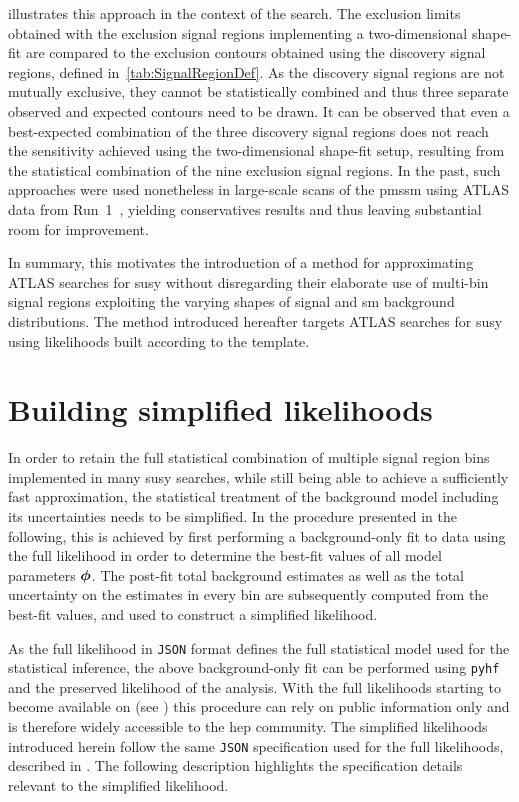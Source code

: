  illustrates this approach in the context of the \onelepton search. The exclusion limits obtained with the exclusion signal regions implementing a two-dimensional shape-fit are compared to the exclusion contours obtained using the discovery signal regions, defined in~\cref{tab:SignalRegionDef}.
As the discovery signal regions are not mutually exclusive, they cannot be statistically combined and thus three separate observed and expected contours need to be drawn. It can be observed that even a best-expected combination of the three discovery signal regions does not reach the sensitivity achieved using the two-dimensional shape-fit setup, resulting from the statistical combination of the nine exclusion signal regions.
In the past, such approaches were used nonetheless in large-scale scans of the \gls{pmssm} using ATLAS data from Run~1~\cite{pMSSM-scan-run1:2015baa,Aaboud:2016wna}, yielding conservatives results and thus leaving substantial room for improvement.

In summary, this motivates the introduction of a method for approximating ATLAS searches for \gls{susy} without disregarding their elaborate use of multi-bin signal regions exploiting the varying shapes of signal and \gls{sm} background distributions. The method introduced hereafter targets ATLAS searches for \gls{susy} using likelihoods built according to the  template.

\section{Building simplified likelihoods}\label{sec:building_simplified_likelihoods}

In order to retain the full statistical combination of multiple signal region bins implemented in many \gls{susy} searches, while still being able to achieve a sufficiently fast approximation, the statistical treatment of the background model including its uncertainties needs to be simplified.
In the procedure presented in the following, this is achieved by first performing a background-only fit to data using the full likelihood in order to determine the best-fit values of all model parameters $\makemebold{\phi}$.
The post-fit total background estimates as well as the total uncertainty on the estimates in every bin are subsequently computed from the best-fit values, and used to construct a simplified likelihood.

As the full likelihood in \texttt{JSON} format defines the full statistical model used for the statistical inference, the above background-only fit can be performed using \texttt{pyhf} and the preserved likelihood of the analysis.
With the full likelihoods starting to become available on  (see \eg {}\cite{fullLH_1Lbb}) this procedure can rely on public information only and is therefore widely accessible to the \gls{hep} community.
The simplified likelihoods introduced herein follow the same \texttt{JSON} specification used for the full likelihoods, described in \cite{ATL-PHYS-PUB-2019-029}.
The following description highlights the specification details relevant to the simplified likelihood. 

